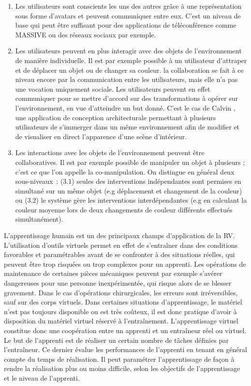 \documentclass[11pt]{article}
\begin{document}
\begin{enumerate}
	\item Les utilisateurs sont conscients les uns des autres grâce à une représentation sous forme d'avatars et peuvent communiquer entre eux. C'est un niveau de base qui peut être suffisant pour des applications de téléconférence comme MASSIVE \cite{massive} ou des réseaux sociaux par exemple.
	\item Les utilisateurs peuvent en plus interagir avec des objets de l'environnement de manière individuelle. Il est par exemple possible à un utilisateur d'attraper et de déplacer un objet ou de changer sa couleur. la collaboration se fait à ce niveau encore par la communication entre les utilisateurs, mais elle n'a pas une vocation uniquement sociale. Les utilisateurs peuvent en effet communiquer pour se mettre d'accord sur des transformations à opérer sur l'environnement, en vue d'atteindre un but donné. C'est le cas de Calvin \cite{calvin}, une application de conception architecturale permettant à plusieurs utilisateurs de s'immerger dans un même environnement afin de modifier et de visualiser en direct l'apparence d'une scène d'intérieur.
	\item Les interactions avec les objets de l'environnement peuvent être collaboratives. Il est par exemple possible de manipuler un objet à plusieurs ; c'est ce que l'on appelle la co-manipulation. On distingue en général deux sous-niveaux~: (3.1) seules des interventions indépendantes sont permises en simultané sur un même objet (e.g déplacement et changement de la couleur) ou (3.2) le système gère les interventions interdépendantes (e.g en calculant la couleur moyenne lors de deux changements de couleur différents effectués simultanément).
\end{enumerate}

L'apprentissage humain est un des principaux champs d'application de la RV. L'utilisation d'outils virtuels permet en effet de s'entraîner dans des conditions favorables et paramétrables avant de se confronter à des situations réelles, qui peuvent être trop risquées ou trop complexes pour un apprenti. Les opérations de maintenance de certaines pièces mécaniques peuvent par exemple s'avérer dangereuses pour une personne inexpérimentée, qui risque alors de se blesser gravement. Dans le cas d'opérations chirurgicales, les erreurs sont irréversibles, sauf sur des corps virtuels. Dans certaines situations d'apprentissage, le matériel n'est pas toujours disponible ou est très coûteux, il est donc pratique d'avoir à disposition du matériel virtuel réservé à l'entraînement. L'apprentissage virtuel constitue donc une coopération entre un apprenti et un entraîneur réel ou virtuel. Le but de l'apprenti est de réaliser un certain nombre de tâches définies par l'entraîneur. Ce dernier évalue les performances de l'apprenti en tenant en général compte du temps de réalisation. Il peut paramétrer l'apprentissage de façon à rendre la réalisation plus ou moins difficile, selon les objectifs de l'apprentissage et le niveau de l'apprenti.
\\
\end{document}
